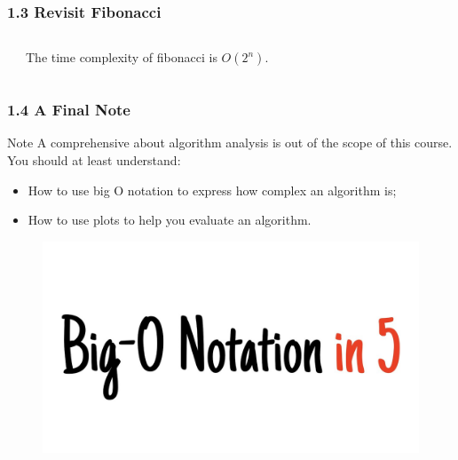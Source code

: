 \documentclass[aspectratio=169, 14pt]{beamer}
\begin{document}
\begin{frame}
    \frametitle{1.3 Revisit Fibonacci}
\begin{columns}
    \begin{center}
    \end{center}
The time complexity of fibonacci is $O(2^n)$.

\end{columns}

\end{frame}

\begin{frame}
    \frametitle{1.4 A Final Note}
\begin{alertblock}{Note}
    A comprehensive about algorithm analysis is out of the scope of this course. You should at least understand:
    
    \begin{itemize}
        \item How to use big O notation to express how complex an algorithm is;
        \item How to use plots to help you evaluate an algorithm.
    \end{itemize}
\end{alertblock}
\end{frame}

\begin{frame}
\begin{figure}
    \href{https://www.youtube.com/watch?v=__vX2sjlpXU}{
        \includegraphics[width=\textwidth]{week2/bigo}
    }
\end{figure}

\end{frame}
\end{document}
